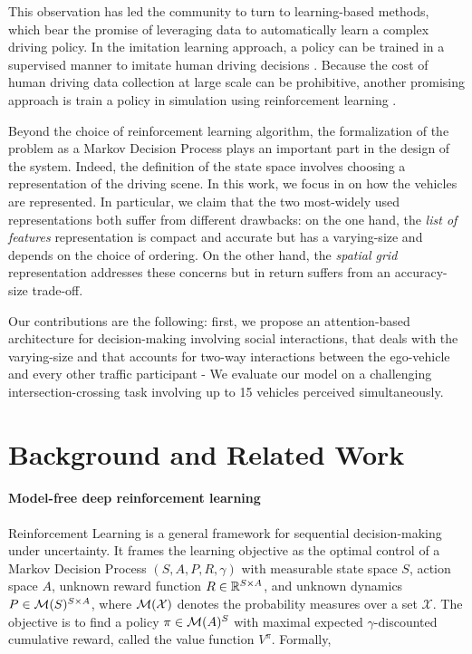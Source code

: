 \documentclass{article}
\begin{document}
This observation has led the community to turn to learning-based methods, which bear the promise of leveraging data to automatically learn a complex driving policy. In the imitation learning approach, a policy can be trained in a supervised manner to imitate human driving decisions \citep{Pomerleau1989, Ross2011, Bojarski2016, Xu2016, Eraqi2017, Codevilla2017, Rehder2017c, Rezagholiradeh2018, Bansal2018}. Because the cost of human driving data collection at large scale can be prohibitive, another promising approach is train a policy in simulation using reinforcement learning \citep{Cardamone2009, Ross2011}.

Beyond the choice of reinforcement learning algorithm, the formalization of the problem as a Markov Decision Process plays an important part in the design of the system. Indeed, the definition of the state space involves choosing a representation of the driving scene. In this work, we focus in on how the vehicles are represented. In particular, we claim that the two most-widely used representations both suffer from different drawbacks: on the one hand, the \emph{list of features} representation is compact and accurate but has a varying-size and depends on the choice of ordering. On the other hand, the \emph{spatial grid} representation addresses these concerns but in return suffers from an accuracy-size trade-off.

Our contributions are the following: first, we propose an attention-based architecture for decision-making involving social interactions, that deals with the varying-size and that accounts for two-way interactions between the ego-vehicle and every other traffic participant
- We evaluate our model on a challenging intersection-crossing task involving up to 15 vehicles perceived simultaneously.

\section{Background and Related Work}

\paragraph{Model-free deep reinforcement learning} Reinforcement Learning is a general framework for sequential decision-making under uncertainty. It frames the learning objective as the optimal control of a Markov Decision Process $(S, A, P, R, \gamma)$ with measurable state space $S$, action space $A$, unknown reward function $R\in\mathbb{R}^{S \times A}$, and unknown dynamics $P\in \mathcal{M}(S)^{S \times A}$, where $\mathcal{M}(\mathcal{X})$ denotes the probability measures over a set $\mathcal{X}$. The objective is to find a policy $\pi\in\mathcal{M}(A)^S$ with maximal expected $\gamma$-discounted cumulative reward, called the value function $V^\pi$. Formally,
\end{document}

